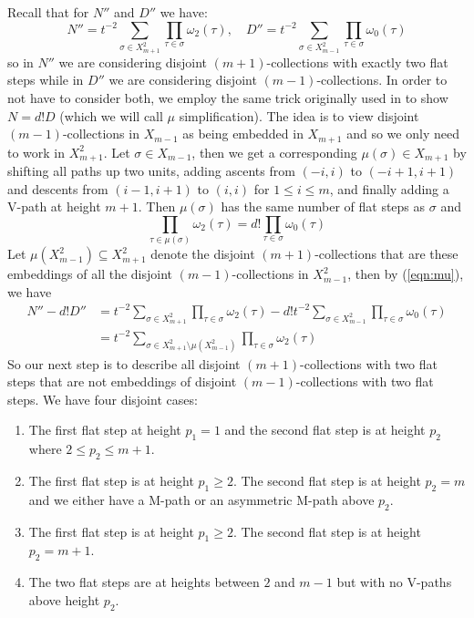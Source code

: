 \documentclass[11pt]{article}
\theoremstyle{mythm}
\begin{document}
Recall that for $N''$ and $D''$ we have:
\begin{equation*}
N'' = t^{-2}\sum\limits_{\sigma\in X_{m+1}^2}\prod\limits_{\tau\in\sigma}\omega_2(\tau),\quad D'' = t^{-2}\sum\limits_{\sigma\in X_{m-1}^2}\prod\limits_{\tau\in\sigma}\omega_0(\tau)
\end{equation*}
so in $N''$ we are considering disjoint $(m+1)$-collections with exactly two flat steps while in $D''$ we are considering disjoint $(m-1)$-collections. In order to not have to consider both, we employ the same trick originally used in \cite{willerton_magnitude_2017} to show $N = d!D$ (which we will call $\mu$ simplification). The idea is to view disjoint $(m-1)$-collections in $X_{m-1}$ as being embedded in $X_{m+1}$ and so we only need to work in $X_{m+1}^2$. Let $\sigma \in X_{m-1}$, then we get a corresponding $\mu(\sigma)\in X_{m+1}$ by shifting all paths up two units, adding ascents from $(-i,i)$ to $(-i+1,i+1)$ and descents from $(i-1,i+1)$ to $(i,i)$ for $1\leq i \leq m$, and finally adding a V-path at height $m+1$. Then $\mu(\sigma)$ has the same number of flat steps as $\sigma$ and
\begin{equation}\label{eqn:mu}
\prod\limits_{\tau\in\mu(\sigma)}\omega_2(\tau) = d!\prod\limits_{\tau\in\sigma}\omega_0(\tau)
\end{equation}
Let $\mu(X_{m-1}^2)\subseteq X_{m+1}^2$ denote the disjoint $(m+1)$-collections that are these embeddings of all the disjoint $(m-1)$-collections in $X_{m-1}^2$, then by (\ref{eqn:mu}), we have
\begin{align*}
N''-d!D'' &= t^{-2}\sum\limits_{\sigma\in X_{m+1}^2}\prod\limits_{\tau\in\sigma}\omega_2(\tau) - d!t^{-2}\sum\limits_{\sigma\in X_{m-1}^2}\prod\limits_{\tau\in\sigma}\omega_0(\tau) \\
&= t^{-2}\sum\limits_{\sigma\in X_{m+1}^2\setminus\mu(X_{m-1}^2)}\prod\limits_{\tau\in\sigma}\omega_2(\tau)
\end{align*}
So our next step is to describe all disjoint $(m+1)$-collections with two flat steps that are not embeddings of disjoint $(m-1)$-collections with two flat steps. We have four disjoint cases:
\begin{enumerate}
\item The first flat step at height $p_1=1$ and the second flat step is at height $p_2$ where $2\leq p_2\leq m+1$.
\item The first flat step is at height $p_1 \geq 2$. The second flat step is at height $p_2 = m$ and we either have a M-path or an asymmetric M-path above $p_2$.
\item The first flat step is at height $p_1 \geq 2$. The second flat step is at height $p_2 = m+1$.
\item The two flat steps are at heights between $2$ and $m-1$ but with no V-paths above height $p_2$.
\end{enumerate}
\end{document}
